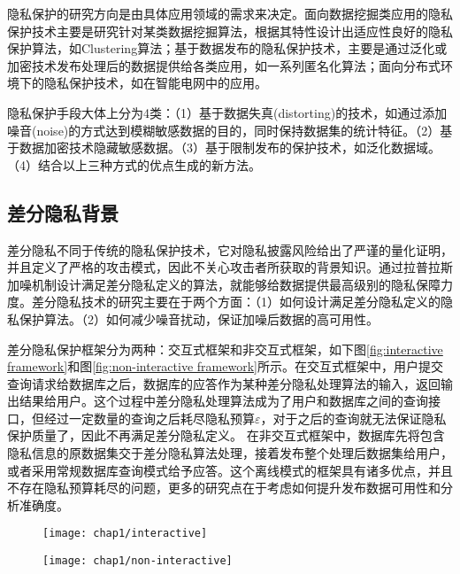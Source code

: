 隐私保护的研究方向是由具体应用领域的需求来决定。面向数据挖掘类应用的隐私保护技术主要是研究针对某类数据挖掘算法，根据其特性设计出适应性良好的隐私保护算法，如Clustering\cite{clustering}算法；基于数据发布的隐私保护技术，主要是通过泛化或加密技术发布处理后的数据提供给各类应用，如一系列匿名化算法\cite{multidimensional k anonymity}；面向分布式环境下的隐私保护技术，如在智能电网中的应用\cite{Distributed Privacy}。

隐私保护手段大体上分为4类\cite{面向数据库应用的隐私保护研究综述}：（1）基于数据失真(distorting)的技术，如通过添加噪音(noise)的方式达到模糊敏感数据的目的，同时保持数据集的统计特征。（2）基于数据加密技术隐藏敏感数据。（3）基于限制发布的保护技术，如泛化数据域。（4）结合以上三种方式的优点生成的新方法。


\subsection{差分隐私背景} %

差分隐私不同于传统的隐私保护技术，它对隐私披露风险给出了严谨的量化证明，并且定义了严格的攻击模式，因此不关心攻击者所获取的背景知识。通过拉普拉斯加噪机制\cite{Dwork Calibrating}设计满足差分隐私定义的算法，就能够给数据提供最高级别的隐私保障力度。差分隐私技术的研究主要在于两个方面：（1）如何设计满足差分隐私定义的隐私保护算法。（2）如何减少噪音扰动，保证加噪后数据的高可用性。

差分隐私保护框架分为两种：交互式框架和非交互式框架，如下图\ref{fig:interactive framework}和图\ref{fig:non-interactive framework}所示。在交互式框架中，用户提交查询请求给数据库之后，数据库的应答作为某种差分隐私处理算法的输入，返回输出结果给用户。这个过程中差分隐私处理算法成为了用户和数据库之间的查询接口，但经过一定数量的查询之后耗尽隐私预算$\varepsilon$，对于之后的查询就无法保证隐私保护质量了，因此不再满足差分隐私定义。
在非交互式框架中，数据库先将包含隐私信息的原数据集交于差分隐私算法处理，接着发布整个处理后数据集给用户，或者采用常规数据库查询模式给予应答。这个离线模式的框架具有诸多优点，并且不存在隐私预算耗尽的问题，更多的研究点在于考虑如何提升发布数据可用性和分析准确度。

\begin{figure}[!htp]
	\centering
	\texttt{[image: chap1/interactive]}
\end{figure}

\begin{figure}[!htp]
	\centering
	\texttt{[image: chap1/non-interactive]}
\end{figure}


